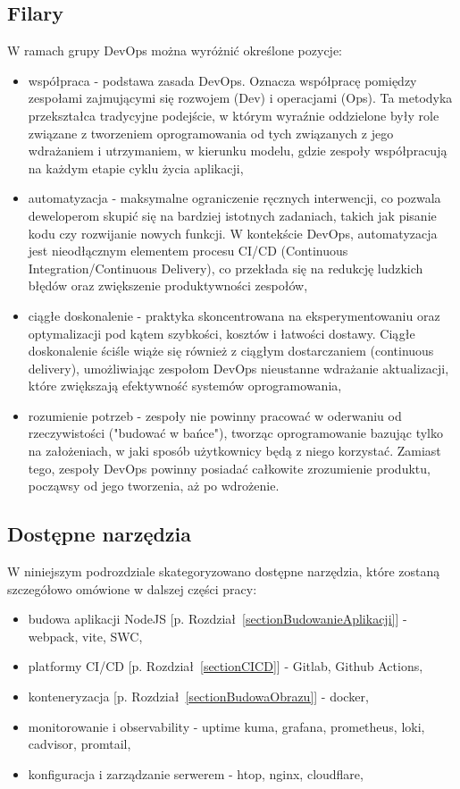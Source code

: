 \documentclass{article}
\newcommand{\chapref}[1]{[p. Rozdział~\ref{#1}]}
\begin{document}
\subsection{Filary}
W ramach grupy DevOps można wyróżnić określone pozycje:
\begin{itemize}
    \item współpraca - podstawa zasada DevOps. Oznacza współpracę pomiędzy zespołami zajmującymi się rozwojem (Dev) i operacjami (Ops). Ta metodyka przekształca tradycyjne podejście, w którym wyraźnie oddzielone były role związane z tworzeniem oprogramowania od tych związanych z jego wdrażaniem i utrzymaniem, w kierunku modelu, gdzie zespoły współpracują na każdym etapie cyklu życia aplikacji,
    \item automatyzacja - maksymalne ograniczenie ręcznych interwencji, co pozwala deweloperom skupić się na bardziej istotnych zadaniach, takich jak pisanie kodu czy rozwijanie nowych funkcji. W kontekście DevOps, automatyzacja jest nieodłącznym elementem procesu CI/CD (Continuous Integration/Continuous Delivery), co przekłada się na redukcję ludzkich błędów oraz zwiększenie produktywności zespołów,
    \item ciągłe doskonalenie - praktyka skoncentrowana na eksperymentowaniu oraz optymalizacji pod kątem szybkości, kosztów i łatwości dostawy. Ciągłe doskonalenie ściśle wiąże się również z ciągłym dostarczaniem (continuous delivery), umożliwiając zespołom DevOps nieustanne wdrażanie aktualizacji, które zwiększają efektywność systemów oprogramowania,
    \item rozumienie potrzeb - zespoły nie powinny pracować w oderwaniu od rzeczywistości ("budować w bańce"), tworząc oprogramowanie bazując tylko na założeniach, w jaki sposób użytkownicy będą z niego korzystać. Zamiast tego, zespoły DevOps powinny posiadać całkowite zrozumienie produktu, począwsy od jego tworzenia, aż po wdrożenie.
\end{itemize}

\subsection{Dostępne narzędzia}

W niniejszym podrozdziale skategoryzowano dostępne narzędzia, które zostaną szczegółowo omówione w dalszej części pracy:

\begin{itemize}
    \item budowa aplikacji NodeJS \chapref{sectionBudowanieAplikacji} - webpack, vite, SWC,
    \item platformy CI/CD \chapref{sectionCICD} - Gitlab, Github Actions,
    \item konteneryzacja \chapref{sectionBudowaObrazu} - docker,
    \item monitorowanie i observability - uptime kuma, grafana, prometheus, loki, cadvisor, promtail,
    \item konfiguracja i zarządzanie serwerem - htop, nginx, cloudflare,
\end{itemize}
\end{document}
